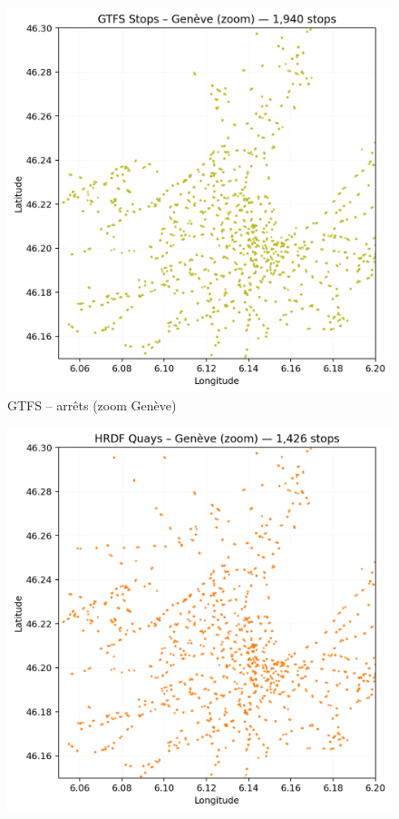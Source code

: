 \begin{figure}[H]
  \centering
  \begin{minipage}[t]{0.49\linewidth}
    \centering
    \includegraphics[width=\linewidth]{figures/plots/gtfs_points_geneva.png}
    \vspace{0.2em}
    \small GTFS – arrêts (zoom Genève)
  \end{minipage}\hfill
  \begin{minipage}[t]{0.49\linewidth}
    \centering
    \includegraphics[width=\linewidth]{figures/plots/hrdf_quays_geneva.png}

\end{minipage}
\end{figure}
